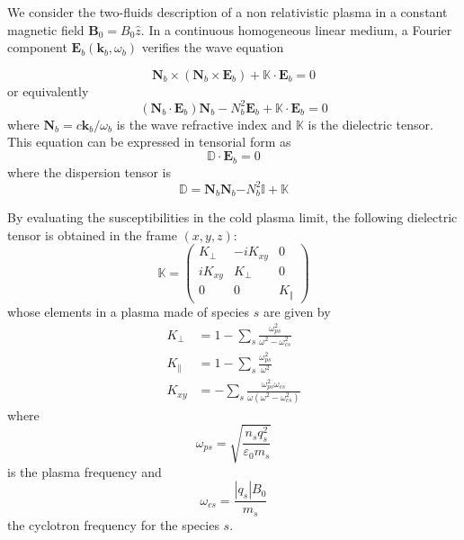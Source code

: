 We consider the two-fluids description of a non relativistic plasma in a
constant magnetic field $\mathbf{B}_{0}=B_{0}\widehat{z}$. In a continuous
homogeneous linear medium, a Fourier component $\mathbf{E}_{b}\left(
\mathbf{k}_{b},\omega_{b}\right)  $ verifies the wave equation \cite{sti92b1}%

\begin{equation}
\mathbf{N}_{b}\times(\mathbf{N}_{b}\times\mathbf{E}_{b})+\mathbb{K}%
\cdot\mathbf{E}_{b}=0
\end{equation}
or equivalently
\begin{equation}
(\mathbf{N}_{b}\cdot\mathbf{E}_{b})\mathbf{N}_{b}-N_{b}^{2}\mathbf{E}%
_{b}+\mathbb{K}\cdot\mathbf{E}_{b}=0
\end{equation}
where $\mathbf{N}_{b}=c\mathbf{k}_{b}/\omega_{b}$ is the wave refractive index
and $\mathbb{K}$ is the dielectric tensor. This equation can be expressed in
tensorial form as
\begin{equation}
\mathbb{D}\cdot\mathbf{E}_{b}=0 \label{waveeq3}%
\end{equation}
where the dispersion tensor is
\begin{equation}
\mathbb{D=}\mathbf{N}_{b}\mathbf{N}_{b}\mathbf{-}N_{b}^{2}\mathbb{I}%
+\mathbb{K}%
\end{equation}

By evaluating the susceptibilities in the cold plasma limit, the following
dielectric tensor is obtained \cite{bon84} in the frame $\left(  x,y,z\right)
$:
\begin{equation}
\mathbb{K}=%
\begin{pmatrix}
K_{\perp} & -iK_{xy} & 0\\
iK_{xy} & K_{\perp} & 0\\
0 & 0 & K_{\Vert}%
\end{pmatrix}
\label{ktensor}%
\end{equation}
whose elements in a plasma made of species $s$ are given by
\begin{align}
K_{\perp}  &  =1-\sum_{s}\frac{\omega_{ps}^{2}}{\omega^{2}-\omega_{cs}^{2}%
}\nonumber\\
K_{\parallel}  &  =1-\sum_{s}\frac{\omega_{ps}^{2}}{\omega^{2}}\nonumber\\
K_{xy}  &  =-\sum_{s}\frac{\omega_{ps}^{2}\omega_{cs}}{\omega(\omega
^{2}-\omega_{cs}^{2})}%
\end{align}
where
\begin{equation}
\omega_{ps}=\sqrt{\frac{n_{s}q_{s}^{2}}{\varepsilon_{0}m_{s}}}%
\end{equation}
is the plasma frequency and
\begin{equation}
\omega_{cs}=\frac{\left|  q_{s}\right|  B_{0}}{m_{s}}%
\end{equation}
the cyclotron frequency for the species $s$.

